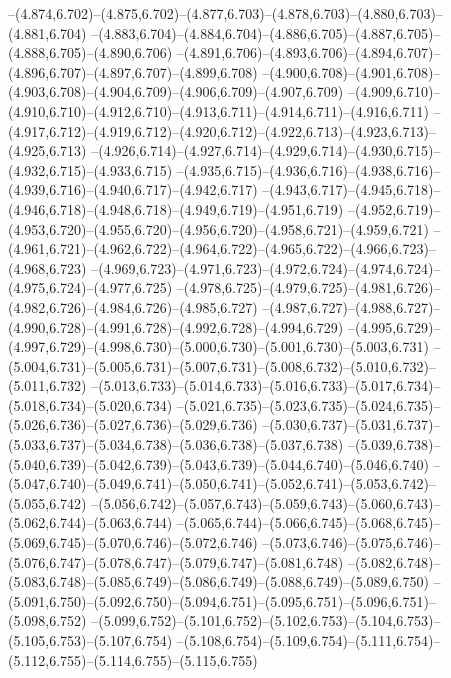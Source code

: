   --(4.874,6.702)--(4.875,6.702)--(4.877,6.703)--(4.878,6.703)--(4.880,6.703)--(4.881,6.704)%
  --(4.883,6.704)--(4.884,6.704)--(4.886,6.705)--(4.887,6.705)--(4.888,6.705)--(4.890,6.706)%
  --(4.891,6.706)--(4.893,6.706)--(4.894,6.707)--(4.896,6.707)--(4.897,6.707)--(4.899,6.708)%
  --(4.900,6.708)--(4.901,6.708)--(4.903,6.708)--(4.904,6.709)--(4.906,6.709)--(4.907,6.709)%
  --(4.909,6.710)--(4.910,6.710)--(4.912,6.710)--(4.913,6.711)--(4.914,6.711)--(4.916,6.711)%
  --(4.917,6.712)--(4.919,6.712)--(4.920,6.712)--(4.922,6.713)--(4.923,6.713)--(4.925,6.713)%
  --(4.926,6.714)--(4.927,6.714)--(4.929,6.714)--(4.930,6.715)--(4.932,6.715)--(4.933,6.715)%
  --(4.935,6.715)--(4.936,6.716)--(4.938,6.716)--(4.939,6.716)--(4.940,6.717)--(4.942,6.717)%
  --(4.943,6.717)--(4.945,6.718)--(4.946,6.718)--(4.948,6.718)--(4.949,6.719)--(4.951,6.719)%
  --(4.952,6.719)--(4.953,6.720)--(4.955,6.720)--(4.956,6.720)--(4.958,6.721)--(4.959,6.721)%
  --(4.961,6.721)--(4.962,6.722)--(4.964,6.722)--(4.965,6.722)--(4.966,6.723)--(4.968,6.723)%
  --(4.969,6.723)--(4.971,6.723)--(4.972,6.724)--(4.974,6.724)--(4.975,6.724)--(4.977,6.725)%
  --(4.978,6.725)--(4.979,6.725)--(4.981,6.726)--(4.982,6.726)--(4.984,6.726)--(4.985,6.727)%
  --(4.987,6.727)--(4.988,6.727)--(4.990,6.728)--(4.991,6.728)--(4.992,6.728)--(4.994,6.729)%
  --(4.995,6.729)--(4.997,6.729)--(4.998,6.730)--(5.000,6.730)--(5.001,6.730)--(5.003,6.731)%
  --(5.004,6.731)--(5.005,6.731)--(5.007,6.731)--(5.008,6.732)--(5.010,6.732)--(5.011,6.732)%
  --(5.013,6.733)--(5.014,6.733)--(5.016,6.733)--(5.017,6.734)--(5.018,6.734)--(5.020,6.734)%
  --(5.021,6.735)--(5.023,6.735)--(5.024,6.735)--(5.026,6.736)--(5.027,6.736)--(5.029,6.736)%
  --(5.030,6.737)--(5.031,6.737)--(5.033,6.737)--(5.034,6.738)--(5.036,6.738)--(5.037,6.738)%
  --(5.039,6.738)--(5.040,6.739)--(5.042,6.739)--(5.043,6.739)--(5.044,6.740)--(5.046,6.740)%
  --(5.047,6.740)--(5.049,6.741)--(5.050,6.741)--(5.052,6.741)--(5.053,6.742)--(5.055,6.742)%
  --(5.056,6.742)--(5.057,6.743)--(5.059,6.743)--(5.060,6.743)--(5.062,6.744)--(5.063,6.744)%
  --(5.065,6.744)--(5.066,6.745)--(5.068,6.745)--(5.069,6.745)--(5.070,6.746)--(5.072,6.746)%
  --(5.073,6.746)--(5.075,6.746)--(5.076,6.747)--(5.078,6.747)--(5.079,6.747)--(5.081,6.748)%
  --(5.082,6.748)--(5.083,6.748)--(5.085,6.749)--(5.086,6.749)--(5.088,6.749)--(5.089,6.750)%
  --(5.091,6.750)--(5.092,6.750)--(5.094,6.751)--(5.095,6.751)--(5.096,6.751)--(5.098,6.752)%
  --(5.099,6.752)--(5.101,6.752)--(5.102,6.753)--(5.104,6.753)--(5.105,6.753)--(5.107,6.754)%
  --(5.108,6.754)--(5.109,6.754)--(5.111,6.754)--(5.112,6.755)--(5.114,6.755)--(5.115,6.755)%
